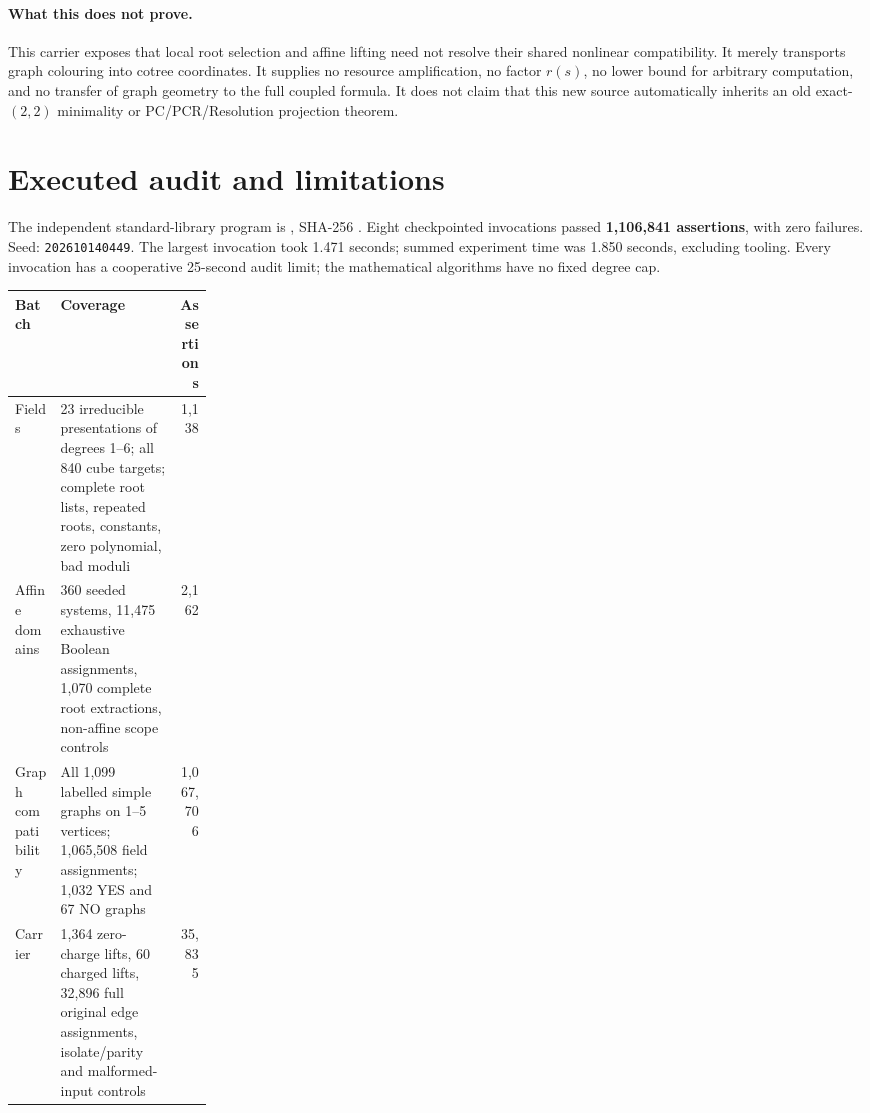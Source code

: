 \documentclass[11pt]{article}
\begin{document}
\paragraph{What this does not prove.}
This carrier exposes that local root selection and affine lifting need not
resolve their shared nonlinear compatibility. It merely transports graph
colouring into cotree coordinates. It supplies no resource amplification,
no factor $r(s)$, no lower bound for arbitrary computation, and no transfer
of graph geometry to the full coupled formula. It does not claim that this
new source automatically inherits an old exact-$(2,2)$ minimality or
PC/PCR/Resolution projection theorem.

\section{Executed audit and limitations}
The independent standard-library program is
, SHA-256
.
Eight checkpointed invocations passed \textbf{1,106,841 assertions}, with
zero failures. Seed: \texttt{202610140449}. The largest invocation took
1.471 seconds; summed experiment time was 1.850 seconds, excluding tooling.
Every invocation has a cooperative 25-second audit limit; the mathematical
algorithms have no fixed degree cap.

\begin{center}\small
\begin{tabularx}{\linewidth}{p{0.23\linewidth}Xr}
\toprule
Batch & Coverage & Assertions\\\midrule
Fields & 23 irreducible presentations of degrees 1--6; all 840 cube targets;
complete root lists, repeated roots, constants, zero polynomial, bad moduli & 1,138\\
Affine domains & 360 seeded systems, 11,475 exhaustive Boolean assignments,
1,070 complete root extractions, non-affine scope controls & 2,162\\
Graph compatibility & All 1,099 labelled simple graphs on 1--5 vertices;
1,065,508 field assignments; 1,032 YES and 67 NO graphs & 1,067,706\\
Carrier & 1,364 zero-charge lifts, 60 charged lifts, 32,896 full original
edge assignments, isolate/parity and malformed-input controls & 35,835\\
\bottomrule
\end{tabularx}
\end{center}
\end{document}
